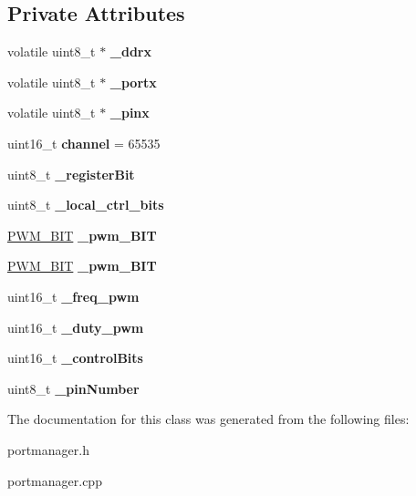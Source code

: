 \subsection*{Private Attributes}
\begin{DoxyCompactItemize}
\item 
\mbox{\label{classPin_a07ee57af89974777d3839df8a13e1791}} 
volatile uint8\+\_\+t $\ast$ {\bfseries \+\_\+ddrx}
\item 
\mbox{\label{classPin_a6bad8a39ce0aece01804bf34474a8a24}} 
volatile uint8\+\_\+t $\ast$ {\bfseries \+\_\+portx}
\item 
\mbox{\label{classPin_ad36da0eaefb41596bb204bbe489c5599}} 
volatile uint8\+\_\+t $\ast$ {\bfseries \+\_\+pinx}
\item 
\mbox{\label{classPin_a38f8a9dd584cf216ab48f4524b6f7808}} 
uint16\+\_\+t {\bfseries channel} = 65535
\item 
\mbox{\label{classPin_abd8ffe1c180d2e91cae0567bd7562192}} 
uint8\+\_\+t {\bfseries \+\_\+register\+Bit}
\item 
\mbox{\label{classPin_a58fa22db3e90c1a048446df1fa0781c9}} 
uint8\+\_\+t {\bfseries \+\_\+local\+\_\+ctrl\+\_\+bits}
\item 
\mbox{\label{classPin_a948a3306a825241abc9634e7d477511a}} 
\hyperlink{structPWM__16BIT}{P\+W\+M\+\_\+B\+IT} {\bfseries \+\_\+pwm\+\_\+B\+IT}
\item 
\mbox{\label{classPin_a94fc11a6e7aea0f84844b8b3627c38b6}} 
\hyperlink{structPWM__8BIT}{P\+W\+M\+\_\+B\+IT} {\bfseries \+\_\+pwm\+\_\+B\+IT}
\item 
\mbox{\label{classPin_a8c83fc94d50888134e19fd3c30fc8184}} 
uint16\+\_\+t {\bfseries \+\_\+freq\+\_\+pwm}
\item 
\mbox{\label{classPin_a0b0f93214d2c2fd6df6e94b931a63674}} 
uint16\+\_\+t {\bfseries \+\_\+duty\+\_\+pwm}
\item 
\mbox{\label{classPin_ad1b2636ee51b9eea404113295a17e2d7}} 
uint16\+\_\+t {\bfseries \+\_\+control\+Bits}
\item 
\mbox{\label{classPin_ae83866782be29ac99476647e3ef26f40}} 
uint8\+\_\+t {\bfseries \+\_\+pin\+Number}
\end{DoxyCompactItemize}


The documentation for this class was generated from the following files\+:\begin{DoxyCompactItemize}
\item 
portmanager.\+h\item 
portmanager.\+cpp\end{DoxyCompactItemize}
